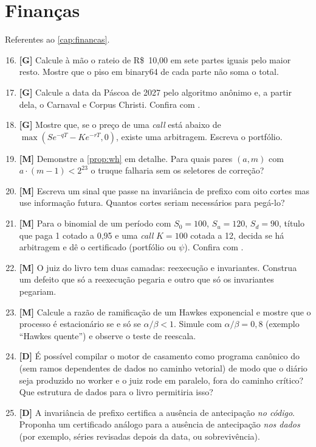 \section*{Finanças}
Referentes ao \autoref{cap:financas}.


\begin{enumerate}
  \setcounter{enumi}{15}
  \item \textbf{[G]} Calcule à mão o rateio de R\$~10,00 em sete partes iguais pelo maior resto. Mostre que o piso em binary64 de cada parte não soma o total.
  \item \textbf{[G]} Calcule a data da Páscoa de 2027 pelo algoritmo anônimo e, a partir dela, o Carnaval e Corpus Christi. Confira com .
  \item \textbf{[G]} Mostre que, se o preço de uma \textit{call} está abaixo de $\max(Se^{-qT} - Ke^{-rT}, 0)$, existe uma arbitragem. Escreva o portfólio.
  \item \textbf{[M]} Demonstre a \autoref{prop:wh} em detalhe. Para quais pares $(a, m)$ com $a \cdot (m-1) < 2^{23}$ o truque falharia sem os seletores de correção?
  \item \textbf{[M]} Escreva um sinal que passe na invariância de prefixo com oito cortes mas use informação futura. Quantos cortes seriam necessários para pegá-lo?
  \item \textbf{[M]} Para o binomial de um período com $S_0 = 100$, $S_u = 120$, $S_d = 90$, título que paga 1 cotado a 0,95 e uma \textit{call} $K = 100$ cotada a 12, decida se há arbitragem e dê o certificado (portfólio ou $\psi$). Confira com .
  \item \textbf{[M]} O juiz do livro tem duas camadas: reexecução e invariantes. Construa um defeito que só a reexecução pegaria e outro que só os invariantes pegariam.
  \item \textbf{[M]} Calcule a razão de ramificação de um Hawkes exponencial e mostre que o processo é estacionário se e só se $\alpha/\beta < 1$. Simule com $\alpha/\beta = 0{,}8$ (exemplo ``Hawkes quente'') e observe o teste de reescala.
  \item \textbf{[D]} É possível compilar o motor de casamento como programa canônico do \vapor{} (sem ramos dependentes de dados no caminho vetorial) de modo que o diário seja produzido no worker e o juiz rode em paralelo, fora do caminho crítico? Que estrutura de dados para o livro permitiria isso?
  \item \textbf{[D]} A invariância de prefixo certifica a ausência de antecipação \emph{no código}. Proponha um certificado análogo para a ausência de antecipação \emph{nos dados} (por exemplo, séries revisadas depois da data, ou sobrevivência).
\end{enumerate}

